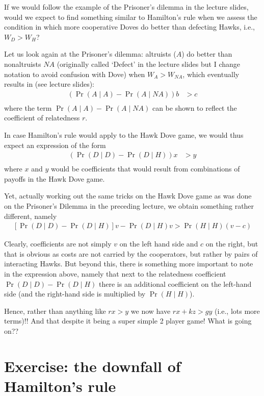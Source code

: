 \documentclass[
]{book}
\begin{document}
If we would follow the example of the Prisoner's dilemma in the lecture slides, would we expect to find something similar to Hamilton's rule when we assess the condition in which more cooperative Doves do better than defecting Hawks, i.e., \(W_{D} > W_{H}\)?

Let us look again at the Prisoner's dilemma: altruists (\(A\)) do better than nonaltruists \(NA\) (originally called `Defect' in the lecture slides but I change notation to avoid confusion with Dove) when \(W_{A} > W_{NA}\), which eventually results in (see lecture slides):
\begin{align}
\left( \Pr(A \mid A ) - \Pr(A \mid NA ) \right ) b &> c \\
\end{align}
where the term \(\Pr(A \mid A ) - \Pr(A \mid NA )\) can be shown to reflect the coefficient of relatedness \(r\).

In case Hamilton's rule would apply to the Hawk Dove game, we would thus expect an expression of the form
\begin{align}
\left(\Pr(D \mid D) - \Pr(D \mid H ) \right ) x &> y \\
\end{align}
where \(x\) and \(y\) would be coefficients that would result from combinations of payoffs in the Hawk Dove game.

Yet, actually working out the same tricks on the Hawk Dove game as was done on the Prisoner's Dilemma in the preceding lecture, we obtain something rather different, namely
\begin{align}
\left [ \Pr (D \mid D) - \Pr ( D \mid H) \right ] v - \Pr (D \mid H) v > \Pr ( H \mid H ) \left (v - c \right )
\end{align}

Clearly, coefficients are not simply \(v\) on the left hand side and \(c\) on the right, but that is obvious as costs are not carried by the cooperators, but rather by pairs of interacting Hawks. But beyond this, there is something more important to note in the expression above, namely that next to the relatedness coefficient \(\Pr(D \mid D) - \Pr(D \mid H )\) there is an additional coefficient on the left-hand side (and the right-hand side is multiplied by \(\Pr(H\mid H)\)).

Hence, rather than anything like \(r x > y\) we now have \(r x + k z > g y\) (i.e., lots more terms)!! And that despite it being a super simple 2 player game! What is going on??

\hypertarget{exercise-the-downfall-of-hamiltons-rule}{%
\section{Exercise: the downfall of Hamilton's rule}\label{exercise-the-downfall-of-hamiltons-rule}}
\end{document}
